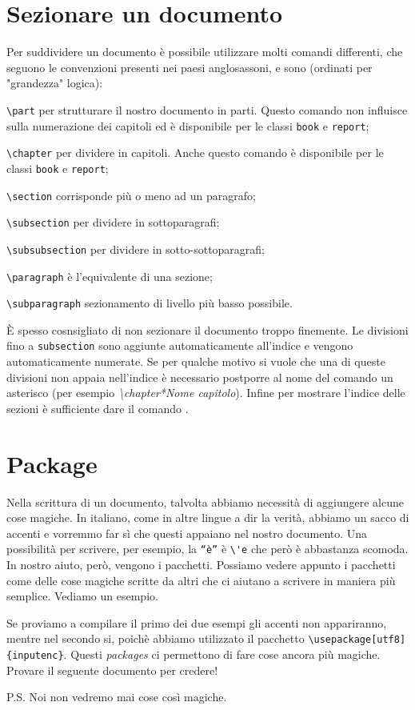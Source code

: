 \section{Sezionare un documento}
Per suddividere un documento è possibile utilizzare molti comandi differenti, che seguono le convenzioni presenti nei paesi anglosassoni, e sono (ordinati per "grandezza" logica):
\begin{description}
    \item \texttt{\textbackslash{}part} per strutturare il nostro documento in
    parti. Questo comando non influisce sulla numerazione dei capitoli ed è
    disponibile per le classi \texttt{book} e \texttt{report};
    \item \texttt{\textbackslash{}chapter} per dividere in capitoli. Anche
    questo comando è disponibile per le classi \texttt{book} e \texttt{report};
    \item \texttt{\textbackslash{}section} corrisponde più o meno ad un 
    paragrafo;
    \item \texttt{\textbackslash{}subsection} per dividere in sottoparagrafi;
    \item \texttt{\textbackslash{}subsubsection} per dividere in
    sotto-sottoparagrafi;
    \item \texttt{\textbackslash{}paragraph} è l'equivalente di una sezione;
    \item \texttt{\textbackslash{}subparagraph} sezionamento di livello più
    basso possibile.
\end{description}
È spesso cosnsigliato di non sezionare il documento troppo finemente. Le 
divisioni fino a \texttt{subsection} sono aggiunte automaticamente all'indice e
vengono automaticamente numerate. Se per qualche motivo si vuole che una di
queste divisioni non appaia nell'indice è necessario postporre al nome del
comando un asterisco (per esempio \emph{\textbackslash{}chapter*{Nome
capitolo}}). Infine per mostrare l'indice delle sezioni è sufficiente dare il
comando \texttt{\textbackslashtableofcontents}.

\section{Package}
Nella scrittura di un documento, talvolta abbiamo necessità di aggiungere 
alcune cose magiche. In italiano, come in altre lingue a dir la verità, 
abbiamo un sacco di accenti e vorremmo far sì che questi appaiano nel nostro 
documento. Una possibilità per scrivere, per esempio, la \texttt{``è''} è 
\verb!\'e! che però è abbastanza scomoda. In nostro aiuto, però, vengono i 
pacchetti. Possiamo vedere appunto i pacchetti come delle cose magiche scritte 
da altri che ci aiutano a scrivere in maniera più semplice. Vediamo un esempio.


Se proviamo a compilare il primo dei due esempi gli accenti non appariranno, 
mentre nel secondo si, poichè abbiamo utilizzato il pacchetto 
\verb!\usepackage[utf8]{inputenc}!. Questi \textit{packages} ci permettono di 
fare cose ancora più magiche. Provare il seguente documento per credere!

P.S. Noi non vedremo mai cose così magiche.